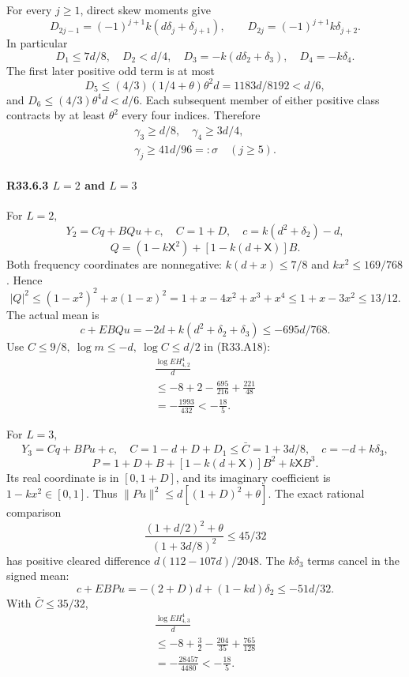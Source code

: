 For every \(j\ge1\), direct skew moments give
\[
D_{2j-1}=(-1)^{j+1}k(d\delta_j+\delta_{j+1}),\qquad
D_{2j}=(-1)^{j+1}k\delta_{j+2}.
\]
In particular
\[
D_1\le7d/8,\quad D_2<d/4,\quad
D_3=-k(d\delta_2+\delta_3),\quad D_4=-k\delta_4.
\]
The first later positive odd term is at most
\[
D_5\le(4/3)(1/4+\theta)\theta^2d
=1183d/8192<d/6,
\]
and \(D_6\le(4/3)\theta^4d<d/6\).
Each subsequent member of either positive class contracts by at
least \(\theta^2\) every four indices. Therefore
\[
\begin{gathered}
\gamma_3\ge d/8,\quad\gamma_4\ge3d/4,\quad\\
\gamma_j\ge41d/96=:\sigma\quad(j\ge5).
\end{gathered}\tag{R33.A35}
\]

\paragraph{R33.6.3 \(L=2\) and \(L=3\)}

For \(L=2,\allowbreak \)
\[
Y_2=Cq+BQu+c,\quad C=1+D,\quad
c=k(d^2+\delta_2)-d,
\]
\[
Q=(1-k\mathsf X^2)+[1-k(d+\mathsf X)]B.
\]
Both frequency coordinates are nonnegative:
\(k(d+x)\le7/8\) and \(kx^2\le169/768\).
Hence
\[
|Q|^2\le(1-x^2)^2+x(1-x)^2
=1+x-4x^2+x^3+x^4\le1+x-3x^2\le13/12.
\]
The actual mean is
\[
c+EBQu=-2d+k(d^2+\delta_2+\delta_3)\le-695d/768.
\]
Use \(C\le9/8,\allowbreak \allowbreak  \ \log m\le-d,\allowbreak \allowbreak  \ \log C\le d/2\) in (R33.A18):
\[
\begin{gathered}
\frac{\log EH_{4,2}^4}{d}\\
\le-8+2-\frac{695}{216}+\frac{221}{48}\\
=-\frac{1993}{432}<-\frac{18}{5}.
\end{gathered}\tag{R33.A36}
\]

For \(L=3,\allowbreak \)
\[
Y_3=Cq+BPu+c,\quad
C=1-d+D+D_1\le\bar C=1+3d/8,\quad c=-d+k\delta_3,
\]
\[
P=1+D+B+[1-k(d+\mathsf X)]B^2+k\mathsf XB^3.
\]
Its real coordinate is in \([0,\allowbreak \allowbreak  1+D]\), and its imaginary coefficient
is \(1-kx^2\in[0,\allowbreak \allowbreak  1]\).
Thus \(\|Pu\|^2\le d[(1+D)^2+\theta]\). The exact rational comparison
\[
\frac{(1+d/2)^2+\theta}{(1+3d/8)^2}\le45/32
\]
has positive cleared difference \(d(112-107d)/2048\).
The \(k\delta_3\) terms cancel in the signed mean:
\[
c+EBPu=-(2+D)d+(1-kd)\delta_2\le-51d/32.
\]
With \(\bar C\le35/32\),
\[
\begin{gathered}
\frac{\log EH_{4,3}^4}{d}\\
\le-8+\frac32-\frac{204}{35}+\frac{765}{128}\\
=-\frac{28457}{4480}<-\frac{18}{5}.
\end{gathered}\tag{R33.A37}
\]

